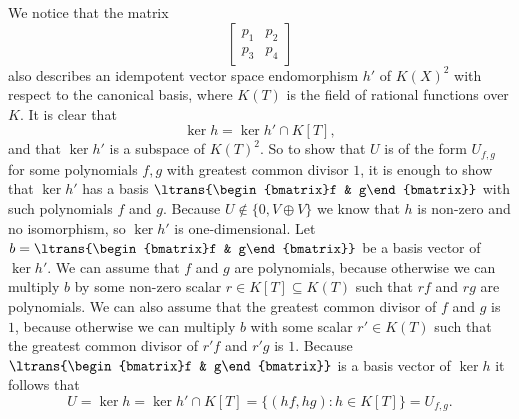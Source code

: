 \documentclass[a4paper,10pt]{article}
\theoremstyle{definition}
\newcommand{\bvect}[1]{\begin{bmatrix}#1\end{bmatrix}}
\begin{document}
We notice that the matrix
\[
 \begin{bmatrix}
  p_1 & p_2 \\
  p_3 & p_4
 \end{bmatrix}
\]
also describes an idempotent vector space endomorphism $h'$ of $K(X)^2$ with respect to the canonical basis, where $K(T)$ is the field of rational functions over $K$. It is clear that
\[
 \ker h = \ker h' \cap K[T],
\]
and that $\ker h'$ is a subspace of $K(T)^2$. So to show that $U$ is of the form $U_{f,g}$ for some polynomials $f,g$ with greatest common divisor $1$, it is enough to show that $\ker h'$ has a basis $\ltrans{\bvect{f & g}}$ with such polynomials $f$ and $g$. Because $U \not\in \{0, V \oplus V\}$ we know that $h$ is non-zero and no isomorphism, so $\ker h'$ is one-dimensional. Let $b = \ltrans{\bvect{f & g}}$ be a basis vector of $\ker h'$. We can assume that $f$ and $g$ are polynomials, because otherwise we can multiply $b$ by some non-zero scalar $r \in K[T] \subseteq K(T)$ such that $rf$ and $rg$ are polynomials. We can also assume that the greatest common divisor of $f$ and $g$ is $1$, because otherwise we can multiply $b$ with some scalar $r' \in K(T)$ such that the greatest common divisor of $r'f$ and $r'g$ is $1$. Because $\ltrans{\bvect{f & g}}$ is a basis vector of $\ker h$ it follows that
\[
 U = \ker h = \ker h' \cap K[T] = \{(hf, hg) : h \in K[T]\} = U_{f,g}.
\]
\end{document}
